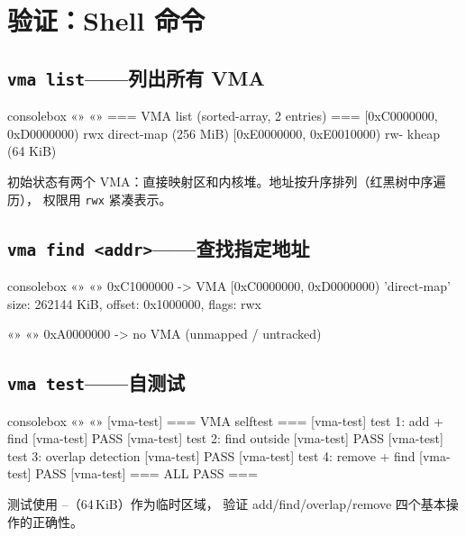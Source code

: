 \section{验证：Shell 命令}
\label{sec:vma-verify}

\subsection{\texttt{vma list}——列出所有 VMA}

\begin{tcblisting}{consolebox}
«\tpk{>}» «»
=== VMA list (sorted-array, 2 entries) ===
  [0xC0000000, 0xD0000000) rwx  direct-map      (256 MiB)
  [0xE0000000, 0xE0010000) rw-  kheap           (64 KiB)
\end{tcblisting}

初始状态有两个 VMA：直接映射区和内核堆。地址按升序排列（红黑树中序遍历），
权限用 \texttt{rwx} 紧凑表示。

\subsection{\texttt{vma find <addr>}——查找指定地址}

\begin{tcblisting}{consolebox}
«\tpk{>}» «»
0xC1000000 -> VMA [0xC0000000, 0xD0000000) 'direct-map'
  size: 262144 KiB, offset: 0x1000000, flags: rwx

«\tpk{>}» «»
0xA0000000 -> no VMA (unmapped / untracked)
\end{tcblisting}

\subsection{\texttt{vma test}——自测试}

\begin{tcblisting}{consolebox}
«\tpk{>}» «»
[vma-test] === VMA selftest ===
[vma-test] test 1: add + find
[vma-test] PASS
[vma-test] test 2: find outside
[vma-test] PASS
[vma-test] test 3: overlap detection
[vma-test] PASS
[vma-test] test 4: remove + find
[vma-test] PASS
[vma-test] === ALL PASS ===
\end{tcblisting}

测试使用 --（64\,KiB）作为临时区域，
验证 add/find/overlap/remove 四个基本操作的正确性。


